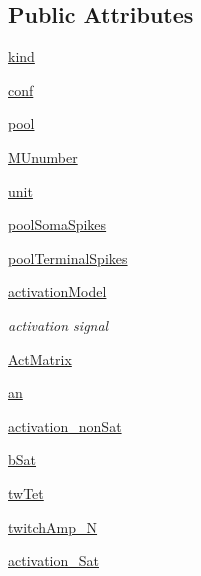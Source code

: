 \subsection*{Public Attributes}
\begin{DoxyCompactItemize}
\item 
\hyperlink{class_motor_unit_pool_1_1_motor_unit_pool_aeb57d0463ad56a16b166d00dc6079b95}{kind}
\item 
\hyperlink{class_motor_unit_pool_1_1_motor_unit_pool_a3b2ee8f3e5500bfdc8fa731a5cb7d622}{conf}
\item 
\hyperlink{class_motor_unit_pool_1_1_motor_unit_pool_a832364dc014aa8a1b2947abfe063f626}{pool}
\item 
\hyperlink{class_motor_unit_pool_1_1_motor_unit_pool_aa5884530baaa20f46007805bc574407d}{M\-Unumber}
\item 
\hyperlink{class_motor_unit_pool_1_1_motor_unit_pool_a1b14c831606c27efae62f1468850393b}{unit}
\item 
\hyperlink{class_motor_unit_pool_1_1_motor_unit_pool_a3790757a111061662ad0f98120b25e69}{pool\-Soma\-Spikes}
\item 
\hyperlink{class_motor_unit_pool_1_1_motor_unit_pool_a4f0b93df27eb6303fa1a3d49653d4fd3}{pool\-Terminal\-Spikes}
\item 
\hyperlink{class_motor_unit_pool_1_1_motor_unit_pool_abaa7680d0691fac81f66b200dfcfd203}{activation\-Model}
\begin{DoxyCompactList}\small\item\em activation signal \end{DoxyCompactList}\item 
\hyperlink{class_motor_unit_pool_1_1_motor_unit_pool_ad03b9e215e833188060e90bc4392d42b}{Act\-Matrix}
\item 
\hyperlink{class_motor_unit_pool_1_1_motor_unit_pool_ac72c67b4a1f6134965ab77e2d798b5a4}{an}
\item 
\hyperlink{class_motor_unit_pool_1_1_motor_unit_pool_a467ac7b080b79b9515d5846d75e95d1c}{activation\-\_\-non\-Sat}
\item 
\hyperlink{class_motor_unit_pool_1_1_motor_unit_pool_a4e107835e34b4f56d06b9b28c143fe40}{b\-Sat}
\item 
\hyperlink{class_motor_unit_pool_1_1_motor_unit_pool_a785a769c5b4824603a24339e4f0d8dfe}{tw\-Tet}
\item 
\hyperlink{class_motor_unit_pool_1_1_motor_unit_pool_a03538b06e7220f9d48c7306ed6508c05}{twitch\-Amp\-\_\-\-N}
\item 
\hyperlink{class_motor_unit_pool_1_1_motor_unit_pool_ac475d1369c38d0bc5064c7243b4e1d44}{activation\-\_\-\-Sat}

\end{DoxyCompactItemize}
